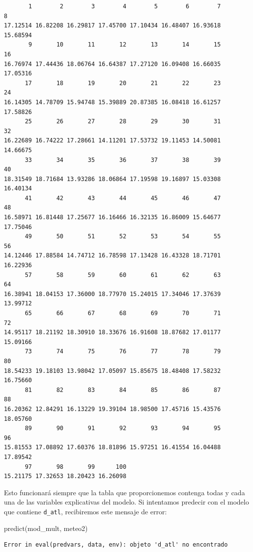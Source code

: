 \documentclass[
  letterpaper,
  DIV=11,
  numbers=noendperiod]{scrreprt}
\newenvironment{Shaded}{\begin{snugshade}}{\end{snugshade}}
\newcommand{\FunctionTok}[1]{\textcolor[rgb]{0.28,0.35,0.67}{#1}}
\newcommand{\NormalTok}[1]{\textcolor[rgb]{0.00,0.23,0.31}{#1}}
\begin{document}
\begin{verbatim}
       1        2        3        4        5        6        7        8 
17.12514 16.82208 16.29817 17.45700 17.10434 16.48407 16.93618 15.68594 
       9       10       11       12       13       14       15       16 
16.76974 17.44436 18.06764 16.64387 17.27120 16.09408 16.66035 17.05316 
      17       18       19       20       21       22       23       24 
16.14305 14.78709 15.94748 15.39889 20.87385 16.08418 16.61257 17.58826 
      25       26       27       28       29       30       31       32 
16.22689 16.74222 17.28661 14.11201 17.53732 19.11453 14.50081 14.66675 
      33       34       35       36       37       38       39       40 
18.31549 18.71684 13.93286 18.06864 17.19598 19.16897 15.03308 16.40134 
      41       42       43       44       45       46       47       48 
16.58971 16.81448 17.25677 16.16466 16.32135 16.86009 15.64677 17.75046 
      49       50       51       52       53       54       55       56 
14.12446 17.88584 14.74712 16.78598 17.13428 16.43328 18.71701 16.22936 
      57       58       59       60       61       62       63       64 
16.38941 18.04153 17.36000 18.77970 15.24015 17.34046 17.37639 13.99712 
      65       66       67       68       69       70       71       72 
14.95117 18.21192 18.30910 18.33676 16.91608 18.87682 17.01177 15.09166 
      73       74       75       76       77       78       79       80 
18.54233 19.18103 13.98042 17.05097 15.85675 18.48408 17.58232 16.75660 
      81       82       83       84       85       86       87       88 
16.20362 12.84291 16.13229 19.39104 18.98500 17.45716 15.43576 18.05760 
      89       90       91       92       93       94       95       96 
15.81553 17.08892 17.60376 18.81896 15.97251 16.41554 16.04488 17.89542 
      97       98       99      100 
15.21175 17.32653 18.20423 16.26098 
\end{verbatim}

Esto funcionará siempre que la tabla que proporcionemos contenga todas y
cada una de las variables explicativas del modelo. Si intentamos
predecir con el modelo que contiene \texttt{d\_atl}, recibiremos este
mensaje de error:

\begin{Shaded}
\begin{Highlighting}[]
\FunctionTok{predict}\NormalTok{(mod\_mult, meteo2)}
\end{Highlighting}
\end{Shaded}

\begin{verbatim}
Error in eval(predvars, data, env): objeto 'd_atl' no encontrado
\end{verbatim}
\end{document}
